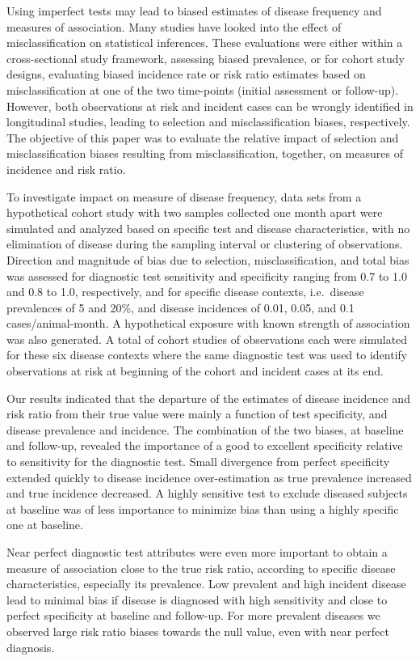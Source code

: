 Using imperfect tests may lead to biased estimates of disease frequency and
measures of association.
Many studies have looked into the effect of misclassification on statistical
inferences.
These evaluations were either within a cross-sectional study framework,
assessing biased prevalence, or for cohort study designs, evaluating biased
incidence rate or risk ratio estimates based on misclassification at one
of the two time-points (initial assessment or follow-up).
However, both observations at risk and incident cases can be wrongly
identified in longitudinal studies, leading to selection and misclassification
biases, respectively.
The objective of this paper was to evaluate the relative impact of selection
and misclassification biases resulting from misclassification, together, on
measures of incidence and risk ratio.

To investigate impact on measure of disease frequency, data sets from a
hypothetical cohort study with two samples collected one month apart were
simulated and analyzed based on specific test and disease characteristics, with
no elimination of disease during the sampling interval or clustering of
observations.
Direction and magnitude of bias due to selection, misclassification, and total
bias was assessed for diagnostic test sensitivity and specificity ranging from
0.7 to 1.0 and 0.8 to 1.0, respectively, and for specific disease contexts,
i.e.\ disease prevalences of 5 and 20\%, and disease incidences of 0.01, 0.05,
and 0.1 cases/animal-month.
A hypothetical exposure with known strength of association
was also generated.
A total of  cohort studies of  observations each
were simulated for these six disease contexts where the same diagnostic test
was used to identify observations at risk at beginning of the cohort and
incident cases at its end.

Our results indicated that the departure of the estimates of disease incidence
and risk ratio from their true value were mainly a function of test
specificity, and disease prevalence and incidence.
The combination of the two biases, at baseline and follow-up, revealed the
importance of a good to excellent specificity relative to sensitivity for the
diagnostic test.
Small divergence from perfect specificity extended quickly to disease
incidence over-estimation as true prevalence increased and true incidence
decreased.
A highly sensitive test to exclude diseased subjects at baseline was of less
importance to minimize bias than using a highly specific one at baseline.

Near perfect diagnostic test attributes were even more important to obtain a
measure of association close to the true risk ratio, according to specific
disease characteristics, especially its prevalence.
Low prevalent and high incident disease lead to minimal bias if disease is
diagnosed with high sensitivity and close to perfect specificity at baseline and
follow-up.
For more prevalent diseases we observed large risk ratio biases towards the
null value, even with near perfect diagnosis.
  
